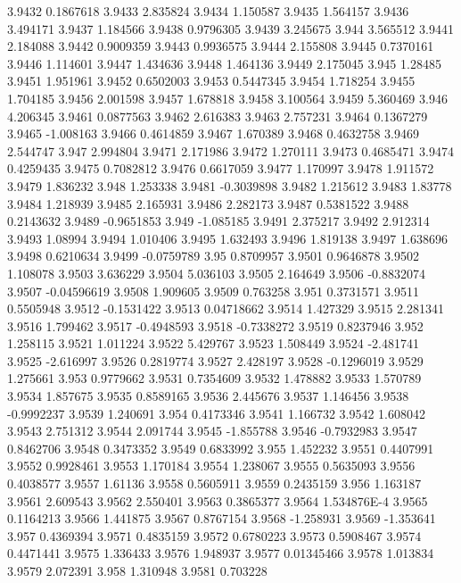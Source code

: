 3.9432  0.1867618
3.9433  2.835824
3.9434  1.150587
3.9435  1.564157
3.9436  3.494171
3.9437  1.184566
3.9438  0.9796305
3.9439  3.245675
3.944  3.565512
3.9441  2.184088
3.9442  0.9009359
3.9443  0.9936575
3.9444  2.155808
3.9445  0.7370161
3.9446  1.114601
3.9447  1.434636
3.9448  1.464136
3.9449  2.175045
3.945  1.28485
3.9451  1.951961
3.9452  0.6502003
3.9453  0.5447345
3.9454  1.718254
3.9455  1.704185
3.9456  2.001598
3.9457  1.678818
3.9458  3.100564
3.9459  5.360469
3.946  4.206345
3.9461  0.0877563
3.9462  2.616383
3.9463  2.757231
3.9464  0.1367279
3.9465  -1.008163
3.9466  0.4614859
3.9467  1.670389
3.9468  0.4632758
3.9469  2.544747
3.947  2.994804
3.9471  2.171986
3.9472  1.270111
3.9473  0.4685471
3.9474  0.4259435
3.9475  0.7082812
3.9476  0.6617059
3.9477  1.170997
3.9478  1.911572
3.9479  1.836232
3.948  1.253338
3.9481  -0.3039898
3.9482  1.215612
3.9483  1.83778
3.9484  1.218939
3.9485  2.165931
3.9486  2.282173
3.9487  0.5381522
3.9488  0.2143632
3.9489  -0.9651853
3.949  -1.085185
3.9491  2.375217
3.9492  2.912314
3.9493  1.08994
3.9494  1.010406
3.9495  1.632493
3.9496  1.819138
3.9497  1.638696
3.9498  0.6210634
3.9499  -0.0759789
3.95  0.8709957
3.9501  0.9646878
3.9502  1.108078
3.9503  3.636229
3.9504  5.036103
3.9505  2.164649
3.9506  -0.8832074
3.9507  -0.04596619
3.9508  1.909605
3.9509  0.763258
3.951  0.3731571
3.9511  0.5505948
3.9512  -0.1531422
3.9513  0.04718662
3.9514  1.427329
3.9515  2.281341
3.9516  1.799462
3.9517  -0.4948593
3.9518  -0.7338272
3.9519  0.8237946
3.952  1.258115
3.9521  1.011224
3.9522  5.429767
3.9523  1.508449
3.9524  -2.481741
3.9525  -2.616997
3.9526  0.2819774
3.9527  2.428197
3.9528  -0.1296019
3.9529  1.275661
3.953  0.9779662
3.9531  0.7354609
3.9532  1.478882
3.9533  1.570789
3.9534  1.857675
3.9535  0.8589165
3.9536  2.445676
3.9537  1.146456
3.9538  -0.9992237
3.9539  1.240691
3.954  0.4173346
3.9541  1.166732
3.9542  1.608042
3.9543  2.751312
3.9544  2.091744
3.9545  -1.855788
3.9546  -0.7932983
3.9547  0.8462706
3.9548  0.3473352
3.9549  0.6833992
3.955  1.452232
3.9551  0.4407991
3.9552  0.9928461
3.9553  1.170184
3.9554  1.238067
3.9555  0.5635093
3.9556  0.4038577
3.9557  1.61136
3.9558  0.5605911
3.9559  0.2435159
3.956  1.163187
3.9561  2.609543
3.9562  2.550401
3.9563  0.3865377
3.9564  1.534876E-4
3.9565  0.1164213
3.9566  1.441875
3.9567  0.8767154
3.9568  -1.258931
3.9569  -1.353641
3.957  0.4369394
3.9571  0.4835159
3.9572  0.6780223
3.9573  0.5908467
3.9574  0.4471441
3.9575  1.336433
3.9576  1.948937
3.9577  0.01345466
3.9578  1.013834
3.9579  2.072391
3.958  1.310948
3.9581  0.703228
